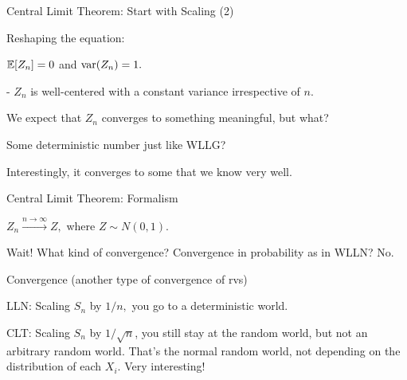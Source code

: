 \begin{frame}{Central Limit Theorem: Start with Scaling (2)}

\plitemsep 0.1in
\bci 
\item Reshaping the equation:

\item<4-> $\mathbb{E}[ Z_n ] = 0$ and $\text{var}( Z_n ) = 1.$ 

- $Z_n$ is well-centered with a constant variance irrespective of $n.$

\item<5-> We expect that $Z_n$ converges to something meaningful, but what?

\item<6-> Some deterministic number just like WLLG? 

\item<7-> Interestingly, it converges to some  that we know very well. 
\eci 
\end{frame}

\begin{frame}{Central Limit Theorem: Formalism}

\plitemsep 0.05in
\bci 
\item<2-> $Z_n \xrightarrow{n \rightarrow \infty} Z,$ where $Z \sim N(0,1).$

\item<3-> Wait! What kind of convergence? Convergence in probability as in WLLN? No.

\item<4-> Convergence  (another type of convergence of rvs)

\item<6->  
\bci
\item<7-> LLN: Scaling $S_n$ by $1/n,$ you go to a deterministic world.
\item<8-> CLT: Scaling $S_n$ by $1/\sqrt{n}$, you still stay at the random world, but not an arbitrary random world. That's the normal random world, not depending on the distribution of each $X_i.$ Very interesting! 
\eci

\eci 
\end{frame}

